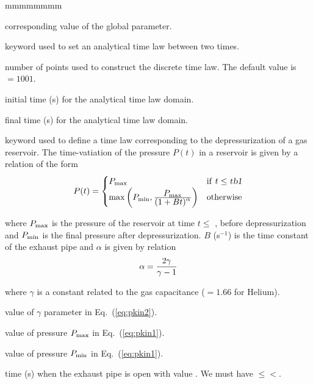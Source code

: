 \begin{ListeDeDescription}{mmmmmmmm}
\item[\dusa{x}] corresponding value of the global parameter.

\item[\moc{T-DELT}] keyword used to set an analytical time law between two times.

\item[\dusa{nxy}] number of points used to construct the discrete time law. The default value is  $=1001$.

\item[\dusa{t1}] initial time (s) for the analytical time law domain.

\item[\dusa{t2}] final time (s) for the analytical time law domain.

\item[\moc{P-VALV}] keyword used to define a time law corresponding to the depressurization of a gas reservoir. The time-vatiation of the pressure $P(t)$ in a
reservoir is given by a relation of the form
\begin{equation}
P(t)=\begin{cases} P_{\rm max} & {\rm if} \ t \le {\rm \dusa{tb1}}\\
\max{\left(P_{\rm min},{\displaystyle P_{\rm max}\over\displaystyle (1+Bt)^\alpha}\right)} & {\rm otherwise}\end{cases}
\label{eq:pkin1}
\end{equation}

\noindent where $P_{\rm max}$ is the pressure of the reservoir at time $t\le$ , before depressurization and $P_{\rm min}$ is the final pressure after
depressurization. $B$ (s$^{-1}$) is the time constant of the exhaust pipe and $\alpha$ is given by relation
\begin{equation}
\alpha={2\gamma\over \gamma-1}
\label{eq:pkin2}
\end{equation}

\noindent where $\gamma$ is a constant related to the gas capacitance ($=1.66$ for Helium).

\item[\dusa{gamma}] value of $\gamma$ parameter in Eq.~(\ref{eq:pkin2}).

\item[\dusa{p1}] value of pressure $P_{\rm max}$ in Eq.~(\ref{eq:pkin1}).

\item[\dusa{p2}] value of pressure $P_{\rm min}$ in Eq.~(\ref{eq:pkin1}).

\item[\dusa{tb1}] time (s) when the exhaust pipe is open with value . We must have $\le$$<$.


\end{ListeDeDescription}
